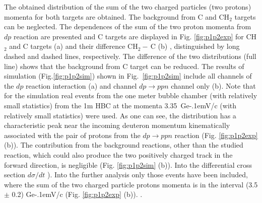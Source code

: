 \documentclass[twocolumn,epjc3]{svjour3}
\newcommand{\dpfrag} {\ensuremath{dp \rightarrow ppn}\xspace}
\newcommand{\GeVc}   {Ge\kern-.1emV/c\xspace}
\providecommand{\DIFaddtex}[1]{{\protect\color{Green} \sf #1}} %
\providecommand{\DIFdeltex}[1]{{\protect\color{Red} \scriptsize #1}} %
\providecommand{\DIFaddbegin}{} %
\providecommand{\DIFaddend}{} %
\providecommand{\DIFdelbegin}{} %
\providecommand{\DIFdelend}{} %
\providecommand{\DIFadd}[1]{\texorpdfstring{\DIFaddtex{#1}}{#1}} %
\providecommand{\DIFdel}[1]{\texorpdfstring{\DIFdeltex{#1}}{}} %
\newcommand{\DIFscaledelfig}{0.5}
\newlength{\DIFdelgraphicswidth} %
\newlength{\DIFdelgraphicsheight} %
\newcommand{\DIFaddincludegraphics}[2][]{{\color{blue}\fbox{\DIFOincludegraphics[#1]{#2}}}} %
\newcommand{\DIFdelincludegraphics}[2][]{%
\sbox{\DIFdelgraphicsbox}{\DIFOincludegraphics[#1]{#2}}%
\settoboxwidth{\DIFdelgraphicswidth}{\DIFdelgraphicsbox} %
\settoboxtotalheight{\DIFdelgraphicsheight}{\DIFdelgraphicsbox} %
\scalebox{\DIFscaledelfig}{%
\parbox[b]{\DIFdelgraphicswidth}{\usebox{\DIFdelgraphicsbox}\\[-\baselineskip] \rule{\DIFdelgraphicswidth}{0em}}\llap{\resizebox{\DIFdelgraphicswidth}{\DIFdelgraphicsheight}{%
\setlength{\unitlength}{\DIFdelgraphicswidth}%
\begin{picture}(1,1)%
\thicklines\linethickness{2pt} %
{\color[rgb]{1,0,0}\put(0,0){\framebox(1,1){}}}%
{\color[rgb]{1,0,0}\put(0,0){\line( 1,1){1}}}%
{\color[rgb]{1,0,0}\put(0,1){\line(1,-1){1}}}%
\end{picture}%
}\hspace*{3pt}}} %
} %
\DeclareRobustCommand{\DIFaddbegin}{\DIFOaddbegin \let\includegraphics\DIFaddincludegraphics} %
\DeclareRobustCommand{\DIFaddend}{\DIFOaddend \let\includegraphics\DIFOincludegraphics} %
\DeclareRobustCommand{\DIFdelbegin}{\DIFOdelbegin \let\includegraphics\DIFdelincludegraphics} %
\DeclareRobustCommand{\DIFdelend}{\DIFOaddend \let\includegraphics\DIFOincludegraphics} %
\begin{document}
The \DIFaddbegin \DIFadd{obtained }\DIFaddend distribution of the sum of the two charged particles (two protons)
momenta for both \DIFdelbegin \DIFdel{targets are obtained. The background from C and }\DIFdelend CH$_2$ \DIFdelbegin \DIFdel{targets can be
neglected. The dependences of the sum of the two proton momenta from $dp$
reaction are presented }\DIFdelend \DIFaddbegin \DIFadd{and C targets are displayed }\DIFaddend in Fig. \ref{fig:p1p2exp}\DIFdelbegin \DIFdel{for CH$_2$ and C targets (a)
and their difference CH$_2-\,$C (b) }\DIFdelend \DIFaddbegin \DIFadd{,
distinguished by long dashed and dashed lines, respectively. The difference of
the two distributions (full line) shows that the background from C target can be
reduced}\DIFaddend . The results of simulation \DIFdelbegin \DIFdel{(Fig.\ref{fig:p1p2sim}) }\DIFdelend \DIFaddbegin \DIFadd{shown in Fig.~\ref{fig:p1p2sim} }\DIFaddend include all
channels \DIFaddbegin \DIFadd{of the }\DIFaddend $dp$ \DIFdelbegin \DIFdel{reaction }\DIFdelend \DIFaddbegin \DIFadd{interaction }\DIFaddend (a) and \DIFdelbegin \DIFdel{channel
}\DIFdelend \dpfrag \DIFaddbegin \DIFadd{channel }\DIFaddend only (b). Note that for
the simulation real events \DIFdelbegin \DIFdel{from the one meter
bubble chamber }\DIFdelend \DIFaddbegin \DIFadd{(with relatively small statistics) from the 1m HBC }\DIFaddend at
the momenta 3.35~\GeVc \DIFdelbegin \DIFdel{(with relatively small statistics) }\DIFdelend were used. As one can see, the distribution has a
characteristic peak near the incoming deuteron momentum kinematically associated
with the pair of protons from the \dpfrag reaction (Fig. \ref{fig:p1p2exp}\DIFdelbegin \DIFdel{(b)).
The contribution from
the background reactions, other than the studied }%
\DIFdel{reaction, which could
also produce the two positively charged track in the forward direction, is
negligible (Fig. \ref{fig:p1p2sim} (b)). Into the differential cross section
$d\sigma/dt$ }\DIFdelend \DIFaddbegin \DIFadd{).
Into the further analysis }\DIFaddend only those events have been included, where the sum of
the two \DIFdelbegin \DIFdel{charged particle }\DIFdelend \DIFaddbegin \DIFadd{protons }\DIFaddend momenta is in the interval (3.5 $\pm$ 0.2) \GeVc\DIFdelbegin \DIFdel{(Fig.
\ref{fig:p1p2exp} (b)).
}\DIFdelend \DIFaddbegin \DIFadd{.
}\DIFaddend 
\end{document}
